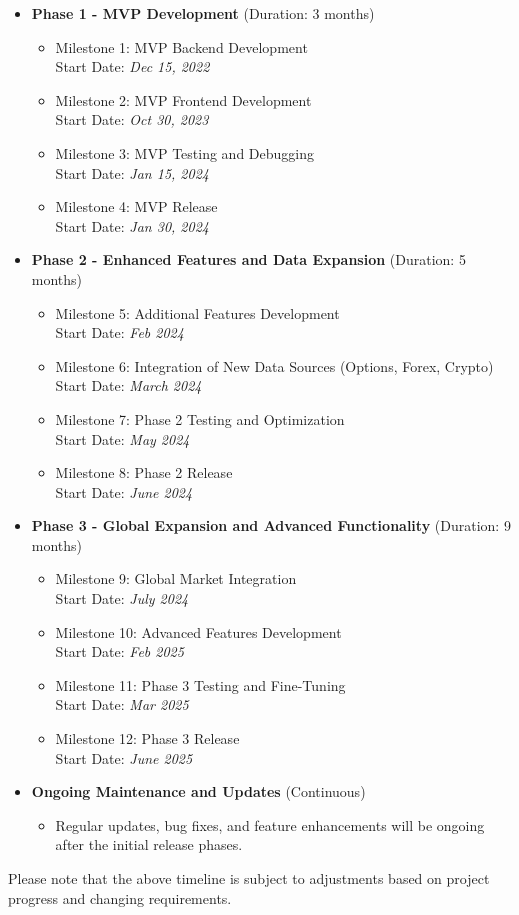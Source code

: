 \begin{itemize}
    \item \textbf{Phase 1 - MVP Development} (Duration: 3 months)
    \begin{itemize}
        \item Milestone 1: MVP Backend Development\\Start Date: \textit{Dec 15, 2022}
        \item Milestone 2: MVP Frontend Development\\Start Date: \textit{Oct 30, 2023}
        \item Milestone 3: MVP Testing and Debugging\\Start Date: \textit{Jan 15, 2024}
        \item Milestone 4: MVP Release\\Start Date: \textit{Jan 30, 2024}
    \end{itemize}
    
    \item \textbf{Phase 2 - Enhanced Features and Data Expansion} (Duration: 5 months)
    \begin{itemize}
        \item Milestone 5: Additional Features Development\\Start Date: \textit{Feb 2024}
        \item Milestone 6: Integration of New Data Sources (Options, Forex, Crypto)\\Start Date: \textit{March 2024}
        \item Milestone 7: Phase 2 Testing and Optimization\\Start Date: \textit{May 2024}
        \item Milestone 8: Phase 2 Release\\Start Date: \textit{June 2024}
    \end{itemize}
    
    \item \textbf{Phase 3 - Global Expansion and Advanced Functionality} (Duration: 9 months)
    \begin{itemize}
        \item Milestone 9: Global Market Integration\\Start Date: \textit{July 2024}
        \item Milestone 10: Advanced Features Development\\Start Date: \textit{Feb 2025}
        \item Milestone 11: Phase 3 Testing and Fine-Tuning\\Start Date: \textit{Mar 2025}
        \item Milestone 12: Phase 3 Release\\Start Date: \textit{June 2025}
    \end{itemize}
    
    \item \textbf{Ongoing Maintenance and Updates} (Continuous)
    \begin{itemize}
        \item Regular updates, bug fixes, and feature enhancements will be ongoing after the initial release phases.
    \end{itemize}
\end{itemize}

Please note that the above timeline is subject to adjustments based on project progress and changing requirements.

